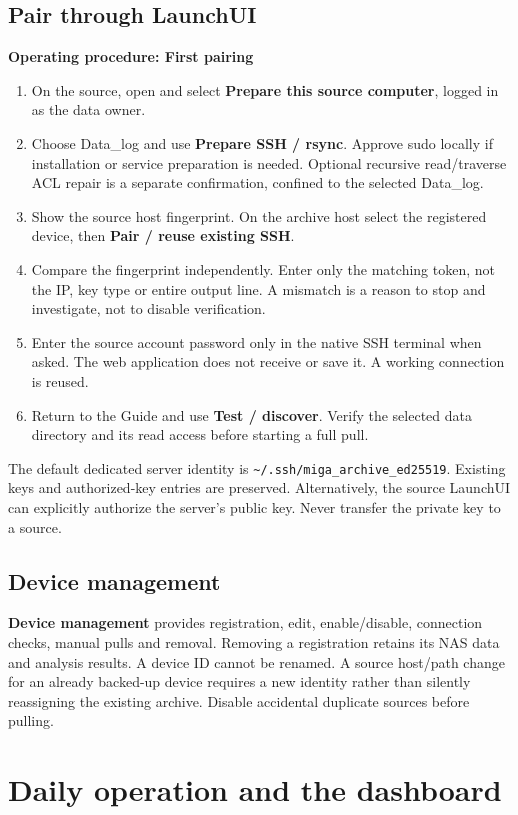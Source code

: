 \documentclass[11pt,oneside,openany]{book}
\newcommand{\code}[1]{\texttt{\detokenize{#1}}}
\newcommand{\pathcode}[1]{\nolinkurl{#1}}
\newcommand{\ui}[1]{\textbf{#1}}
\newenvironment{procedure}[1]{\par\medskip\noindent\textbf{Operating procedure: #1}\par\smallskip\begin{enumerate}}{\end{enumerate}\medskip}
\begin{document}
\section{Pair through LaunchUI}
\begin{procedure}{First pairing}
\item On the source, open \code{./launch_code --archive} and select
\ui{Prepare this source computer}, logged in as the data owner.
\item Choose Data\_log and use \ui{Prepare SSH / rsync}. Approve sudo locally if
installation or service preparation is needed. Optional recursive read/traverse ACL
repair is a separate confirmation, confined to the selected Data\_log.
\item Show the source host fingerprint. On the archive host select the registered
device, then \ui{Pair / reuse existing SSH}.
\item Compare the fingerprint independently. Enter only the matching
\code{SHA256:...} token, not the IP, key type or entire output line. A mismatch is
a reason to stop and investigate, not to disable verification.
\item Enter the source account password only in the native SSH terminal when asked.
The web application does not receive or save it. A working connection is reused.
\item Return to the Guide and use \ui{Test / discover}. Verify the selected data
directory and its read access before starting a full pull.
\end{procedure}
The default dedicated server identity is
\pathcode{~/.ssh/miga_archive_ed25519}. Existing keys and authorized-key entries
are preserved. Alternatively, the source LaunchUI can explicitly authorize the
server's public key. Never transfer the private key to a source.

\section{Device management}
\ui{Device management} provides registration, edit, enable/disable, connection
checks, manual pulls and removal. Removing a registration retains its NAS data and
analysis results. A device ID cannot be renamed. A source host/path change for an
already backed-up device requires a new identity rather than silently reassigning
the existing archive. Disable accidental duplicate sources before pulling.

\chapter{Daily operation and the dashboard}
\end{document}
